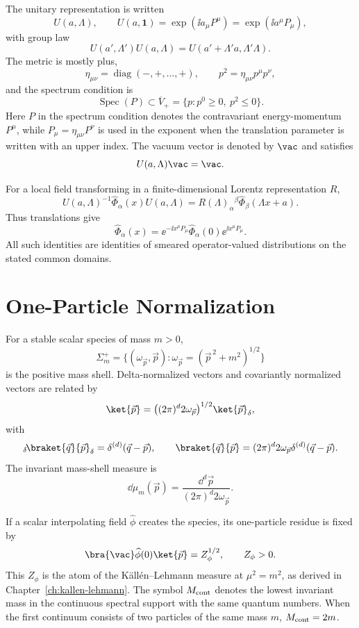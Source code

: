 \begin{convention}
\label{conv:volume-ii-poincare-field-conventions}
The unitary representation is written
\[
  U(a,\Lambda),\qquad
  U(a,\mathbf 1)=\exp(\ii a_\mu P^\mu)=\exp(\ii a^\mu P_\mu),
\]
with group law
\[
  U(a',\Lambda')U(a,\Lambda)
  =
  U(a'+\Lambda'a,\Lambda'\Lambda).
\]
The metric is mostly plus,
\[
  \eta_{\mu\nu}=\operatorname{diag}(-,+,\ldots,+),
  \qquad
  p^2=\eta_{\mu\nu}p^\mu p^\nu,
\]
and the spectrum condition is
\[
  \operatorname{Spec}(P)\subset\overline V_+
  =
  \{p:p^0\ge0,\ p^2\le0\}.
\]
Here \(P\) in the spectrum condition denotes the contravariant
energy-momentum \(P^\mu\), while \(P_\mu=\eta_{\mu\nu}P^\nu\) is used in the
exponent when the translation parameter is written with an upper index.
The vacuum vector is denoted by \(\vac\) and satisfies
\[
  U(a,\Lambda)\vac=\vac .
\]

For a local field transforming in a finite-dimensional Lorentz
representation \(R\),
\[
  U(a,\Lambda)^{-1}\widehat\Phi_\alpha(x)U(a,\Lambda)
  =
  R(\Lambda)_\alpha{}^\beta\widehat\Phi_\beta(\Lambda x+a).
\]
Thus translations give
\[
  \widehat\Phi_\alpha(x)
  =
  \ee^{-\ii x^\mu P_\mu}\widehat\Phi_\alpha(0)
  \ee^{\ii x^\mu P_\mu}.
\]
All such identities are identities of smeared operator-valued distributions on
the stated common domains.
\end{convention}

\section{One-Particle Normalization}

\begin{definition}
\label{def:volume-ii-one-particle-normalization}
For a stable scalar species of mass \(m>0\),
\[
  \Sigma_m^+
  =
  \{(\omega_{\vec p},\vec p):\omega_{\vec p}=(\vec p^{\,2}+m^2)^{1/2}\}
\]
is the positive mass shell.  Delta-normalized vectors and covariantly
normalized vectors are related by
\[
  \ket{\vec p}
  =
  \bigl((2\pi)^d2\omega_{\vec p}\bigr)^{1/2}\ket{\vec p}_\delta,
\]
with
\[
  {}_\delta\!\braket{\vec q}{\vec p}_\delta
  =
  \delta^{(d)}(\vec q-\vec p),
  \qquad
  \braket{\vec q}{\vec p}
  =
  (2\pi)^d2\omega_{\vec p}\delta^{(d)}(\vec q-\vec p).
\]
The invariant mass-shell measure is
\[
  \dd\mu_m(\vec p)
  =
  \frac{\dd^d\vec p}{(2\pi)^d2\omega_{\vec p}} .
\]

If a scalar interpolating field \(\widehat\phi\) creates the species, its
one-particle residue is fixed by
\[
  \bra{\vac}\widehat\phi(0)\ket{\vec p}=Z_\phi^{1/2},
  \qquad Z_\phi>0.
\]
This \(Z_\phi\) is the atom of the K\"all\'en--Lehmann measure at
\(\mu^2=m^2\), as derived in Chapter~\ref{ch:kallen-lehmann}.  The symbol
\(M_{\rm cont}\) denotes the lowest invariant mass in the continuous spectral
support with the same quantum numbers.  When the first continuum consists of
two particles of the same mass \(m\), \(M_{\rm cont}=2m\).
\end{definition}

